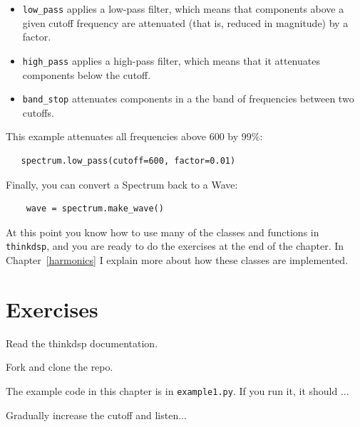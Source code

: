 \documentclass[12pt]{book}
\begin{document}
\begin{itemize}

\item \verb"low_pass" applies a low-pass filter, which means that
  components above a given cutoff frequency are attenuated (that is,
  reduced in magnitude) by a factor.

\item \verb"high_pass" applies a high-pass filter, which means that
  it attenuates components below the cutoff.

\item \verb"band_stop" attenuates components in a the band of
frequencies between two cutoffs.

\end{itemize}

This example attenuates all frequencies above 600 by 99\%:

\begin{verbatim}
   spectrum.low_pass(cutoff=600, factor=0.01)
\end{verbatim}

Finally, you can convert a Spectrum back to a Wave:

\begin{verbatim}
    wave = spectrum.make_wave()
\end{verbatim}

At this point you know how to use many of the classes and functions in
{\tt thinkdsp}, and you are ready to do the exercises at the end of
the chapter.  In Chapter~\ref{harmonics} I explain more
about how these classes are implemented.



\section{Exercises}

\begin{exercise}
Read the thinkdsp documentation.
\end{exercise}

\begin{exercise}
Fork and clone the repo.
\end{exercise}

\begin{exercise}
The example code in this chapter is in {\tt example1.py}.  If you
run it, it should ...

Gradually increase the cutoff and listen...
\end{exercise}
\end{document}
